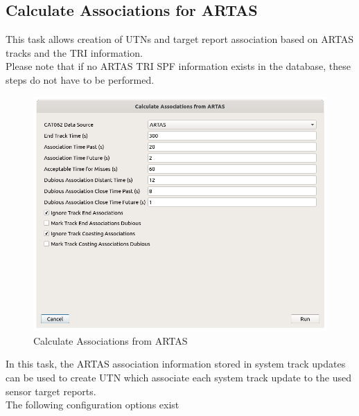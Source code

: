 \subsection{Calculate Associations for ARTAS}
\label{sec:task_associate_tr_artas}

This task allows creation of UTNs and target report association based on ARTAS tracks and the TRI information. \\

Please note that if no ARTAS TRI SPF information exists in the database, these steps do not have to be performed.\\

\begin{figure}[H]
  \center
    \includegraphics[width=16cm]{figures/artas_association_config.png}
  \caption{Calculate Associations from ARTAS}
\end{figure}

In this task, the ARTAS association information stored in system track updates can be used to create UTN which associate each system track update to the used sensor target reports. \\

The following configuration options exist

